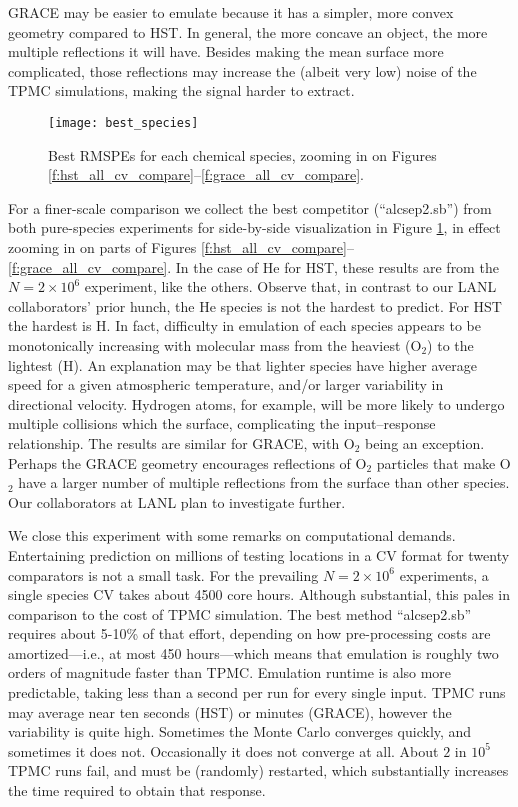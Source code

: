 \documentclass[12pt]{article}
\begin{document}
GRACE may be easier to emulate because it has a simpler, more convex geometry
compared to HST.  In general, the more concave an object, the more multiple
reflections it will have.  Besides making the mean surface more complicated,
those reflections may increase the (albeit very low) noise of the TPMC
simulations, making the signal harder to extract.

\begin{figure}[ht!]
\centering
\texttt{[image: best\_species]}
\vspace{-0.5cm}
\caption{Best RMSPEs for each chemical species, zooming in on Figures \ref{f:hst_all_cv_compare}--\ref{f:grace_all_cv_compare}.}
\label{f:best_species}
\end{figure}	

For a finer-scale comparison we collect the best competitor (``alcsep2.sb'')
from both pure-species experiments for side-by-side visualization in Figure
\ref{f:best_species}, in effect zooming in on parts of Figures
\ref{f:hst_all_cv_compare}--\ref{f:grace_all_cv_compare}.  In the case of He
for HST, these results are from the $N=2 \times 10^6$ experiment, like the others.
Observe that, in contrast to our LANL collaborators' prior hunch, the He
species is not the hardest to predict.  For HST the hardest is H. In fact,
difficulty in emulation of each species appears to be monotonically increasing
with molecular mass from the heaviest (O$_2$) to the lightest (H).  An
explanation may be that lighter species have higher average speed for a given
atmospheric temperature, and/or larger variability in directional velocity.
Hydrogen atoms, for example, will be more likely to undergo multiple
collisions which the surface, complicating the input--response relationship.
The results are similar for GRACE, with O$_2$ being an exception. Perhaps the
GRACE geometry encourages reflections of O$_2$ particles that make O$_2$ have
a larger number of multiple reflections from the surface than other species.
Our collaborators at LANL plan to investigate further.

We close this experiment with some remarks on computational demands.
Entertaining prediction on millions of testing locations in a CV format for
twenty comparators is not a small task.  For the prevailing $N=2\times 10^6$
experiments, a single species CV takes about 4500 core hours.  Although
substantial, this pales in comparison to the cost of TPMC simulation.  The
best method ``alcsep2.sb'' requires about 5-10\% of that effort, depending on
how pre-processing costs are amortized---i.e., at most 450 hours---which means
that emulation is roughly two orders of magnitude faster than TPMC.  Emulation
runtime is also more predictable, taking less than a second per run for every
single input.  TPMC runs may average near ten seconds (HST) or minutes (GRACE),
however the variability is quite high.  Sometimes the Monte Carlo converges
quickly, and sometimes it does not.  Occasionally it does not converge at all.
About $2$ in $10^5$ TPMC runs fail, and must be (randomly) restarted,
which substantially increases the time required to obtain that response.
\end{document}
